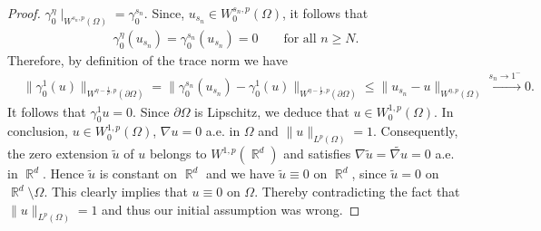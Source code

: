\documentclass[12pt, reqno]{amsart}%
\theoremstyle{plain}  %
\theoremstyle{definition}  %
\theoremstyle{remark}
\numberwithin{equation}{section}
\DeclareMathOperator{\R}{\mathbb{R}}
\begin{document}
\begin{proof}
$ \gamma^\eta_0\mid_{W^{s_n,p}(\Omega)}= \gamma^{s_n}_0$.
Since, $u_{s_n}\in  W^{s_n,p}_0(\Omega)$, it follows that
\begin{align*}
\gamma^\eta_0 (u_{s_n})= \gamma^{s_n}_0 (u_{s_n})=0\qquad\text{for all $n\geq N$}.
\end{align*}
Therefore, by definition of the trace norm we have
\begin{align*}
&\|\gamma^1_0(u)\|_{W^{\eta-\frac{1}{p},p}(\partial\Omega)}
=\|\gamma^{s_n}_0(u_{s_n}) -\gamma^1_0(u)\|_{W^{\eta-\frac{1}{p},p}(\partial\Omega)}\leq \|u_{s_n}-u\|_{W^{\eta,p}(\Omega)} \xrightarrow{s_n\to 1^-}0.
\end{align*}
It follows that  $\gamma^1_0 u=0$. Since  $\partial\Omega$ is Lipschitz, we deduce that  $u \in W^{1,p}_0(\Omega)$. In conclusion,  $u \in W^{1,p}_0(\Omega)$, $\nabla u = 0$ a.e. in $\Omega$ and $\|u\|_{L^p(\Omega)}=1$. Consequently,  the zero extension $\widetilde{u}$ of $u$ belongs to  $ W^{1,p}(\R^d)$ and satisfies $\nabla \widetilde{u}=  \widetilde{\nabla u}= 0$ a.e. in $\R^d$. Hence $\widetilde{u}$ is constant on $\R^d$ and we have $\widetilde{u}\equiv0$ on $\R^d$, since $\widetilde{u}= 0$ on $\R^d \setminus \Omega$. This clearly implies that  $u \equiv 0$ on $\Omega$. Thereby contradicting the fact that $\|u\|_{L^p(\Omega)}=1$  and thus our initial assumption was wrong.
\end{proof}

\end{document}
